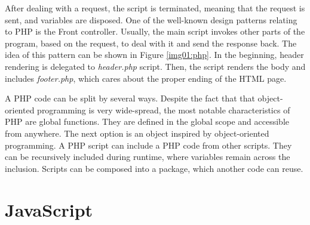 After dealing with a request, the script is terminated, meaning that the request is sent, and variables are disposed.
One of the well-known design patterns relating to PHP is the Front controller.
Usually, the main script invokes other parts of the program, based on the request, to deal with it and send the response back.
The idea of this pattern can be shown in Figure \ref{img01:php}.
In the beginning, header rendering is delegated to \textit{header.php} script.
Then, the script renders the body and includes \textit{footer.php}, which cares about the proper ending of the HTML page.
\par
A PHP code can be split by several ways.
Despite the fact that that object-oriented programming is very wide-spread, the most notable characteristics of PHP are global functions.
They are defined in the global scope and accessible from anywhere.
The next option is an object inspired by object-oriented programming.
A PHP script can include a PHP code from other scripts.
They can be recursively included during runtime, where variables remain across the inclusion.
Scripts can be composed into a package, which another code can reuse.

\section{JavaScript}

